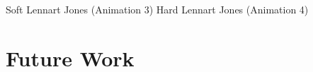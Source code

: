\documentclass{beamer}
\renewcommand{\(}{\left(}
\renewcommand{\)}{\right)}
\begin{document}
\begin{frame}%
Soft Lennart Jones (Animation 3)
Hard Lennart Jones (Animation 4)
\end{frame}

\begin{frame}%
\end{frame}

\begin{frame}%
\end{frame}


\section{Future Work}%
\begin{frame}
\end{frame}
\end{document}
